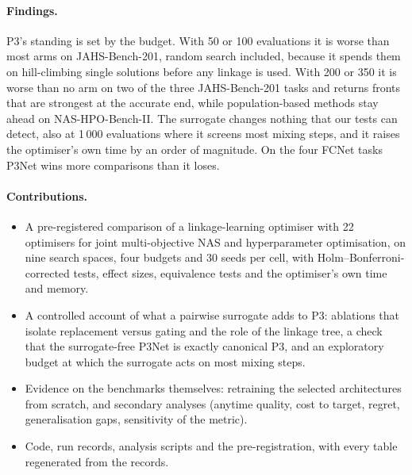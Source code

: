 \paragraph{Findings.} P3's standing is set by the budget. With 50 or 100 evaluations it is worse than most arms on
JAHS-Bench-201, random search included, because it spends them on hill-climbing single solutions before any linkage
is used. With 200 or 350 it is worse than no arm on two of the three JAHS-Bench-201 tasks and returns fronts that are
strongest at the accurate end, while population-based methods stay ahead on NAS-HPO-Bench-II. The surrogate changes
nothing that our tests can detect, also at 1\,000 evaluations where it screens most mixing steps, and it raises the
optimiser's own time by an order of magnitude. On the four FCNet tasks P3Net wins more comparisons than it loses.

\paragraph{Contributions.}
\begin{itemize}
    \item A pre-registered comparison of a linkage-learning optimiser with 22 optimisers for joint multi-objective
    NAS and hyperparameter optimisation, on nine search spaces, four budgets and 30 seeds per cell, with
    Holm--Bonferroni-corrected tests, effect sizes, equivalence tests and the optimiser's own time and memory.
    \item A controlled account of what a pairwise surrogate adds to P3: ablations that isolate replacement versus
    gating and the role of the linkage tree, a check that the surrogate-free P3Net is exactly canonical P3, and an
    exploratory budget at which the surrogate acts on most mixing steps.
    \item Evidence on the benchmarks themselves: retraining the selected architectures from scratch, and secondary
    analyses (anytime quality, cost to target, regret, generalisation gaps, sensitivity of the metric).
    \item Code, run records, analysis scripts and the pre-registration, with every table regenerated from the
    records.
\end{itemize}
